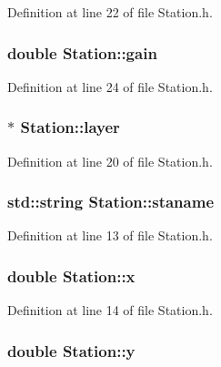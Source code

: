 Definition at line 22 of file Station.h.

\hypertarget{classStation_a132660da885c826d92750aee2e469cfe}{
\subsubsection[{gain}]{\setlength{\rightskip}{0pt plus 5cm}double {\bf Station::gain}}}
\label{classStation_a132660da885c826d92750aee2e469cfe}


Definition at line 24 of file Station.h.

\hypertarget{classStation_aad67aa8d99ed867ff834ef644ef4f511}{
\subsubsection[{layer}]{$\ast$ {\bf Station::layer}}}
\label{classStation_aad67aa8d99ed867ff834ef644ef4f511}


Definition at line 20 of file Station.h.

\hypertarget{classStation_a0522258bd22862151977578f38f6afb0}{
\subsubsection[{staname}]{\setlength{\rightskip}{0pt plus 5cm}std::string {\bf Station::staname}}}
\label{classStation_a0522258bd22862151977578f38f6afb0}


Definition at line 13 of file Station.h.

\hypertarget{classStation_ac1d5d46d39015ec4522003bef2aec3b9}{
\subsubsection[{x}]{\setlength{\rightskip}{0pt plus 5cm}double {\bf Station::x}}}
\label{classStation_ac1d5d46d39015ec4522003bef2aec3b9}


Definition at line 14 of file Station.h.

\hypertarget{classStation_a2ecc6909273662f773e27c7c56c1f658}{
\subsubsection[{y}]{\setlength{\rightskip}{0pt plus 5cm}double {\bf Station::y}}}
\label{classStation_a2ecc6909273662f773e27c7c56c1f658}


